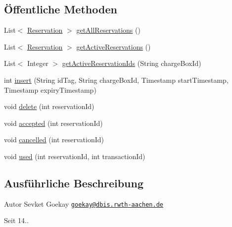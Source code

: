 \subsection*{Öffentliche Methoden}
\begin{DoxyCompactItemize}
\item 
List$<$ \hyperlink{classde_1_1rwth_1_1idsg_1_1steve_1_1repository_1_1dto_1_1_reservation}{Reservation} $>$ \hyperlink{classde_1_1rwth_1_1idsg_1_1steve_1_1repository_1_1_reservation_repository_impl_a0f47222f383a9ce24a6a034cdd1c6815}{get\-All\-Reservations} ()
\item 
List$<$ \hyperlink{classde_1_1rwth_1_1idsg_1_1steve_1_1repository_1_1dto_1_1_reservation}{Reservation} $>$ \hyperlink{classde_1_1rwth_1_1idsg_1_1steve_1_1repository_1_1_reservation_repository_impl_afdd1e3499ed9f88a8616a7326c5de006}{get\-Active\-Reservations} ()
\item 
List$<$ Integer $>$ \hyperlink{classde_1_1rwth_1_1idsg_1_1steve_1_1repository_1_1_reservation_repository_impl_a7fa1c0293179659d81debb4e9fe85239}{get\-Active\-Reservation\-Ids} (String charge\-Box\-Id)
\item 
int \hyperlink{classde_1_1rwth_1_1idsg_1_1steve_1_1repository_1_1_reservation_repository_impl_a3965e27212a0a95ad3580e7a50d2b6d7}{insert} (String id\-Tag, String charge\-Box\-Id, Timestamp start\-Timestamp, Timestamp expiry\-Timestamp)
\item 
void \hyperlink{classde_1_1rwth_1_1idsg_1_1steve_1_1repository_1_1_reservation_repository_impl_a7da85e3db905963781b6a74e994d5378}{delete} (int reservation\-Id)
\item 
void \hyperlink{classde_1_1rwth_1_1idsg_1_1steve_1_1repository_1_1_reservation_repository_impl_a3f724b1605799bc2320680b4dfe82ac8}{accepted} (int reservation\-Id)
\item 
void \hyperlink{classde_1_1rwth_1_1idsg_1_1steve_1_1repository_1_1_reservation_repository_impl_a1f54bdeb002e1a4162e7c96b6768718c}{cancelled} (int reservation\-Id)
\item 
void \hyperlink{classde_1_1rwth_1_1idsg_1_1steve_1_1repository_1_1_reservation_repository_impl_a3b53b88501f1d4072453d54e3544171f}{used} (int reservation\-Id, int transaction\-Id)
\end{DoxyCompactItemize}


\subsection{Ausführliche Beschreibung}
\begin{DoxyAuthor}{Autor}
Sevket Goekay \href{mailto:goekay@dbis.rwth-aachen.de}{\tt goekay@dbis.\-rwth-\/aachen.\-de} 
\end{DoxyAuthor}
\begin{DoxySince}{Seit}
14.. 
\end{DoxySince}


